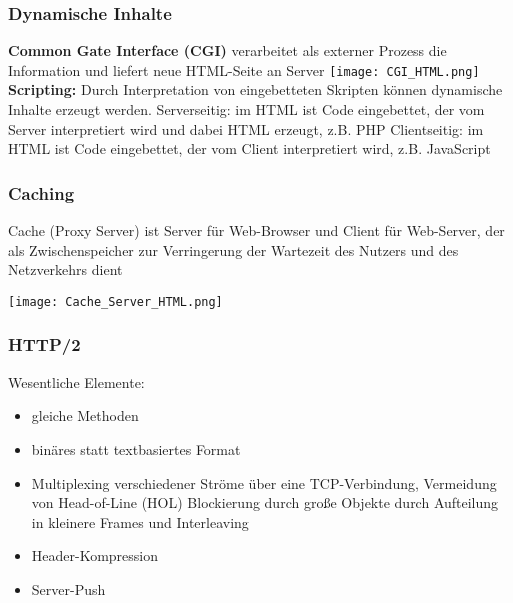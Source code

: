 		\subsubsection{Dynamische Inhalte}
			\textbf{Common Gate Interface (CGI)} verarbeitet als externer Prozess die Information und liefert neue HTML-Seite an Server \newline \newline
			\texttt{[image: CGI\_HTML.png]}
			\captionof{figure}{CGI}
			\textbf{Scripting:} Durch Interpretation von eingebetteten Skripten können dynamische Inhalte erzeugt werden.\newline \newline
			Serverseitig: im HTML ist Code eingebettet, der vom Server interpretiert wird und dabei HTML erzeugt, z.B. PHP \newline \newline
			Clientseitig: im HTML ist Code eingebettet, der vom Client interpretiert wird, z.B. JavaScript
		\subsubsection{Caching}
			Cache (Proxy Server) ist Server für Web-Browser und Client für Web-Server, der als Zwischenspeicher zur Verringerung der Wartezeit des Nutzers und des Netzverkehrs dient
			\begin{center}
				\texttt{[image: Cache\_Server\_HTML.png]}
			\end{center}
		\subsubsection{HTTP/2}
			Wesentliche Elemente: 
			\begin{itemize}
				\item gleiche Methoden
				\item binäres statt textbasiertes Format
				\item Multiplexing verschiedener Ströme über eine TCP-Verbindung, Vermeidung von Head-of-Line (HOL) Blockierung durch große Objekte durch Aufteilung in kleinere Frames und Interleaving
				\item Header-Kompression
				\item Server-Push
			\end{itemize}
